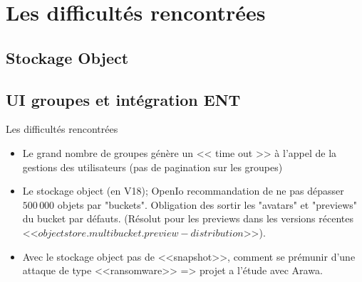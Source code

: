 
\section{Les difficultés rencontrées}

\subsection{Stockage Object}

\subsection{UI groupes et intégration ENT}

\begin{frame}[fragile]{Les difficultés rencontrées}
\begin{itemize}
\item Le grand nombre de groupes génère un << time out >> à l'appel de la gestions des utilisateurs (pas de pagination sur les groupes)
\item Le stockage object (en V18);  OpenIo recommandation de ne pas dépasser $500\,000$ objets par "buckets". Obligation des sortir les "avatars" et "previews" du bucket par défauts. (Résolut pour les previews dans les versions récentes <<$objectstore.multibucket.preview-distribution$>>).
\item Avec le stockage object pas de <<snapshot>>, comment se prémunir d'une attaque de type <<ransomware>> => projet a l'étude avec Arawa. 


\end{itemize}

\end{frame}
